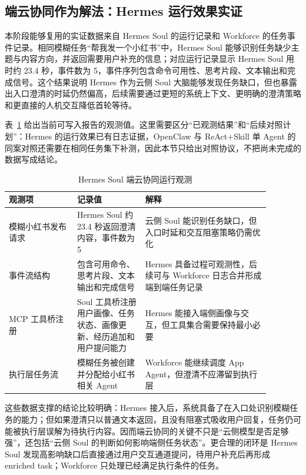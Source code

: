 \subsection{端云协同作为解法：Hermes 运行效果实证}

本阶段能够复用的实证数据来自 Hermes Soul 的运行记录和 Workforce 的任务事件记录。相同模糊任务“帮我发一个小红书”中，Hermes Soul 能够识别任务缺少主题与内容方向，并返回需要用户补充的信息；对应运行记录显示 Hermes Soul 用时约 23.4 秒，事件数为 5，事件序列包含命令可用性、思考片段、文本输出和完成信号。这个结果说明 Hermes 作为云侧 Soul 大脑能够发现任务缺口，但也暴露出入口澄清的时延仍然偏高，后续需要通过更短的系统上下文、更明确的澄清策略和更直接的人机交互降低首轮等待。

表~\ref{tab:rt4-hermes-observation} 给出当前可写入报告的观测值。这里需要区分“已观测结果”和“后续对照计划”：Hermes 的运行效果已有日志证据，OpenClaw 与 ReAct+Skill 单 Agent 的同案对照还需要在相同任务集下补测，因此本节只给出对照协议，不把尚未完成的数据写成结论。

\begin{table}[h]
\centering
\begin{tabular}{p{0.23\linewidth}p{0.23\linewidth}p{0.42\linewidth}}
\hline
\textbf{观测项} & \textbf{记录值} & \textbf{解释} \\
\hline
模糊小红书发布请求 & Hermes Soul 约 23.4 秒返回澄清内容，事件数为 5 & 云侧 Soul 能识别任务缺口，但入口时延和交互阻塞策略仍需优化 \\
事件流结构 & 包含可用命令、思考片段、文本输出和完成信号 & Hermes 具备过程可观测性，后续可与 Workforce 日志合并形成端到端任务记录 \\
MCP 工具桥注册 & Soul 工具桥注册用户画像、任务状态、画像更新、经历追加和用户提问能力 & Hermes 能接入端侧画像与交互，但工具集合需要保持最小必要 \\
执行层任务流 & 模糊任务被创建并分配给小红书相关 Agent & Workforce 能继续调度 App Agent，但澄清不应滞留到执行层 \\
\hline
\end{tabular}
\caption{Hermes Soul 端云协同运行观测}
\label{tab:rt4-hermes-observation}
\end{table}

这些数据支撑的结论比较明确：Hermes 接入后，系统具备了在入口处识别模糊任务的能力；但如果澄清只以普通文本返回，且没有阻塞式吸收用户回复，任务仍可能被执行层误解为待执行内容。因而端云协同的关键不只是“云侧模型是否足够强”，还包括“云侧 Soul 的判断如何影响端侧任务状态”。更合理的闭环是 Hermes Soul 发现高影响缺口后直接通过用户交互通道提问，待用户补充后再形成 enriched task；Workforce 只处理已经满足执行条件的任务。

